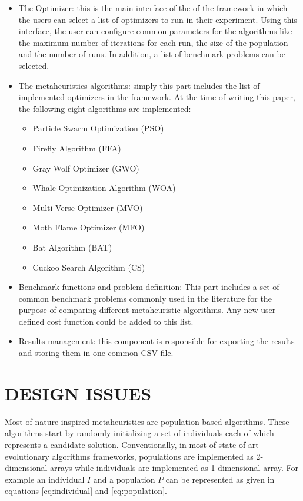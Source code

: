 \documentclass[a4paper,twoside]{article}
\begin{document}
\begin{itemize}
\item The Optimizer: this is the main interface of the of the framework in which the users can select a list of optimizers to run in their experiment. Using this interface, the user can configure common parameters for the algorithms like the maximum number of iterations for each run, the size of the population and the number of runs. In addition, a list of benchmark problems can be selected.

\item The metaheuristics algorithms: simply this part includes the list of implemented optimizers in the framework. At the time of writing this paper, the following eight algorithms are implemented:

\begin{itemize}
\item Particle Swarm Optimization (PSO)
\item  Firefly Algorithm (FFA) \cite{Yang2010FFA} 
\item Gray Wolf Optimizer (GWO)\cite{Mirjalili201446}
\item Whale Optimization Algorithm (WOA) \cite{Mirjalili201651}
\item Multi-Verse Optimizer (MVO) \cite{Mirjalili2016}
\item Moth Flame Optimizer (MFO) \cite{Mirjalili2015228}
\item Bat Algorithm (BAT) \cite{Yang2010}
\item Cuckoo Search Algorithm (CS) \cite{Yang2009}
\end{itemize}



\item Benchmark functions and problem definition: This part includes a set of common benchmark problems commonly used in the literature for the purpose of comparing different metaheuristic algorithms. Any new user-defined cost function could be added to this list.

\item Results management: this component is responsible for exporting the results and storing them in one common CSV file. 
\end{itemize}


\section{\uppercase{Design issues}}

Most of nature inspired metaheuristics are population-based algorithms. These algorithms start by randomly initializing a set of individuals each of which represents a candidate solution. Conventionally, in most of state-of-art evolutionary algorithms frameworks, populations are implemented as 2-dimensional arrays while individuals are implemented as 1-dimensional array. For example an individual $I$ and a population $P$ can be represented as given in equations \ref{eq:individual} and \ref{eq:population}.
\end{document}
